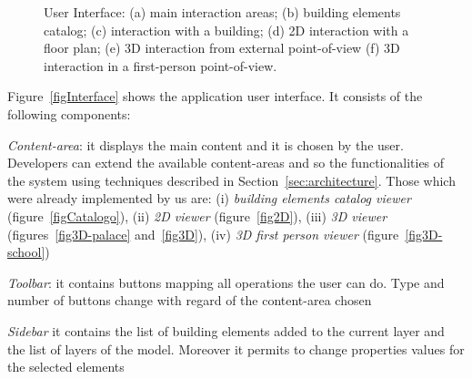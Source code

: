 \begin{figure}[htbp]
   \caption{User Interface: (a) main interaction areas; (b) building elements catalog; (c) interaction with a building; (d) 2D interaction with a floor plan; (e) 3D interaction from external point-of-view (f) 3D interaction in a first-person point-of-view.}
   \label{fig:er}
\end{figure}





Figure~\ref{figInterface} shows the application user interface. It consists of the following components:

\emph{Content-area}: it displays the main content and it is chosen by the user. Developers can extend the available content-areas and so the functionalities of the system using techniques described in Section~\ref{sec:architecture}. Those which were already implemented by us are: (i) \emph{building elements catalog viewer} (figure~\ref{figCatalogo}), (ii) \emph{2D viewer} (figure~\ref{fig2D}), (iii) \emph{3D viewer} (figures~\ref{fig3D-palace} and~\ref{fig3D}), (iv) \emph{3D first person viewer} (figure~\ref{fig3D-school})

\emph{Toolbar}: it contains buttons mapping all operations the user can do. Type and number of buttons change with regard of the content-area chosen

\emph{Sidebar} it contains the list of building elements added to the current layer and the list of layers of the model. Moreover it permits to change properties values for the selected elements\\





